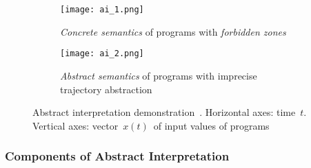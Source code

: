 \begin{figure}[hbt]
    \centering

    \begin{subfigure}[hbt]{.45 \linewidth}
        \centering
        \texttt{[image: ai\_1.png]}
        \caption{%
            \emph{Concrete semantics} of programs with
            \emph{forbidden zones}
        }
        \label{fig:ai1}
    \end{subfigure}
%
    \hfill
%
    \begin{subfigure}[hbt]{.45\linewidth}
        \centering
        \texttt{[image: ai\_2.png]}
        \caption{%
            \emph{Abstract semantics} of programs with imprecise
            trajectory abstraction
        }
        \label{fig:ai2}
    \end{subfigure}

    \caption{%
        Abstract interpretation demonstration~\cite{AIInNutshellCousot}.
        Horizontal axes: time~$ t $. Vertical axes:
        vector~$ x(t) $~of input values of programs
    }
\end{figure}

\subsubsection{Components of Abstract Interpretation}

